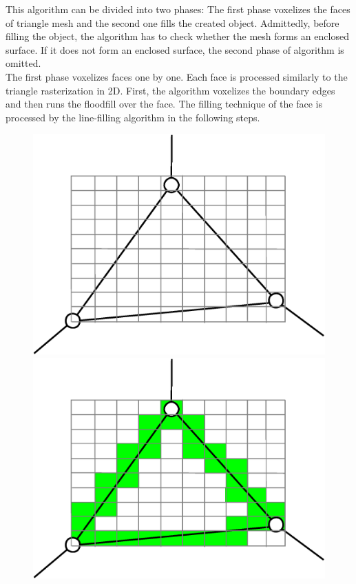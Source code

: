 This algorithm can be divided into two phases: The first phase voxelizes the faces of triangle mesh and the
second one fills the created object. Admittedly, before filling the object, the algorithm has to check
whether the mesh forms an enclosed surface. If it does not form an enclosed surface, the second phase of
algorithm is omitted.\\

The first phase voxelizes faces one by one. Each face is processed similarly to the triangle 
rasterization in 2D.
First, the algorithm voxelizes the boundary edges and then runs the floodfill over the face. The filling
technique of the face is processed by the line-filling algorithm in the following steps. 

\begin{figure}
\centering
\includegraphics[scale=0.25]{../img/voxelize_1.eps}
\includegraphics[scale=0.25]{../img/voxelize_2.eps}\\

\end{figure}
